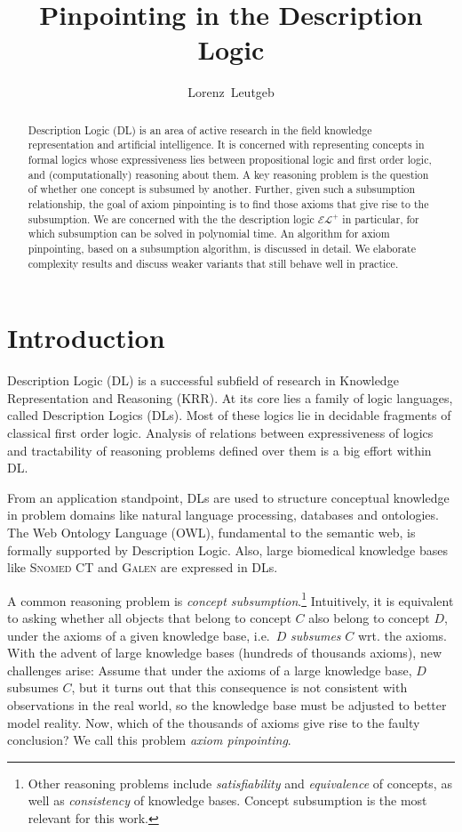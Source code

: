 \documentclass{llncs}
\title{Pinpointing in the Description Logic \elp}
\author{Lorenz~Leutgeb}
\institute{International Center for Computational Logic, TU Dresden\\ \email{lorenz.leutgeb@mailbox.tu-dresden.de}}
\newcommand{\elp}{\ensuremath{\mathcal{EL^+}}\xspace}
\newcommand{\snomed}{\textsc{Snomed CT}\xspace}
\newcommand{\galen}{\textsc{Galen}\xspace}
\begin{document}
\maketitle

\begin{abstract}
Description Logic (DL) is an area of active research in the field knowledge representation and artificial intelligence. It is concerned with representing concepts in formal logics whose expressiveness lies between propositional logic and first order logic, and (computationally) reasoning about them.
A key reasoning problem is the question of whether one concept is subsumed by another. Further, given such a subsumption relationship, the goal of axiom pinpointing is to find those axioms that give rise to the subsumption.
We are concerned with the the description logic \elp in particular, for which subsumption can be solved in polynomial time. An algorithm for axiom pinpointing, based on a subsumption algorithm, is discussed
in detail. We elaborate complexity results and discuss weaker variants that still behave well in practice.
\end{abstract}

\section{Introduction}
\label{intro}

Description Logic (DL) is a successful subfield of research in Knowledge Representation and Reasoning (KRR). At its core lies a family of logic languages, called Description Logics  (DLs). Most of these logics lie in decidable fragments of classical first order logic. Analysis of relations between expressiveness of logics and tractability of reasoning problems defined over them is a big effort within DL.

From an application standpoint, DLs are used to structure conceptual knowledge in problem domains like natural language processing, databases and ontologies. The Web Ontology Language (OWL), fundamental to the semantic web, is formally supported by Description Logic. Also, large biomedical knowledge bases like \snomed and \galen are expressed in DLs.

A common reasoning problem is \emph{concept subsumption}.\footnote{Other reasoning problems include \emph{satisfiability} and \emph{equivalence} of concepts, as well as \emph{consistency} of knowledge bases. Concept subsumption is the most relevant for this work.} Intuitively, it is equivalent to asking whether all objects that belong to concept $C$ also belong to concept $D$, under the axioms of a given knowledge base, i.e.~$D$ \emph{subsumes} $C$ wrt. the axioms. With the advent of large knowledge bases (hundreds of thousands axioms), new challenges arise: Assume that under the axioms of a large knowledge base, $D$ subsumes $C$, but it turns out that this consequence is not consistent with observations in the real world, so the knowledge base must be adjusted to better model reality. Now, which of the thousands of axioms give rise to the faulty conclusion? We call this problem \emph{axiom pinpointing}.
\end{document}
